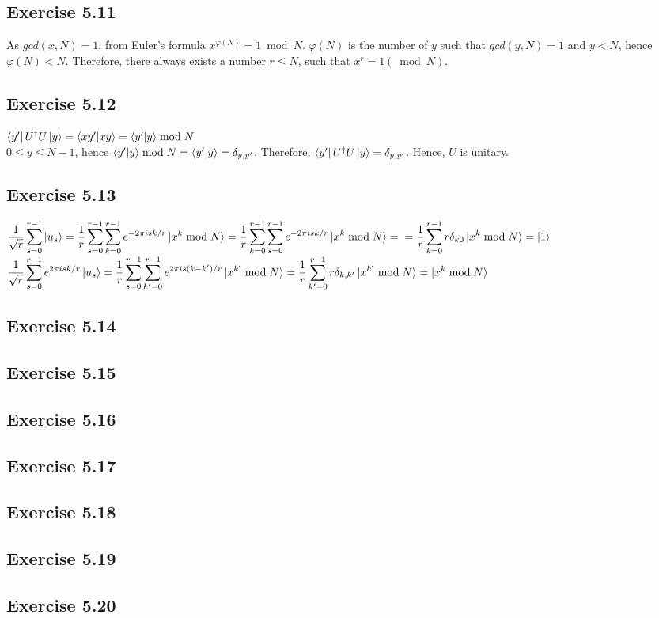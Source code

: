 \documentclass[a4paper,12pt]{article}
\begin{document}
\subsection*{Exercise 5.11}
As $gcd(x, N)=1$, from Euler's formula $x^{\varphi(N)}=1\bmod N$. $\varphi(N)$ is the number
of $y$ such that $gcd(y,N)=1$ and $y<N$, hence $\varphi(N)<N$. Therefore, there always exists a
number $r\leq N$, such that $x^r=1(\bmod N)$.
\subsection*{Exercise 5.12}
$\bra{y^\prime}U^\dagger U\ket{y}=\braket{xy^\prime|xy}=\braket{y^\prime|y}\bmod N$\\
$0\leq y\leq N-1$, hence $\braket{y^\prime|y}\bmod N=\braket{y^\prime|y}=\delta_{y,y^\prime}$. Therefore,
$\bra{y^\prime}U^\dagger U\ket{y}=\delta_{y,y^\prime}$.
Hence, $U$ is unitary.
\subsection*{Exercise 5.13}
$\displaystyle\frac{1}{\sqrt{r}}\displaystyle\sum_{s=0}^{r-1}\ket{u_s}=
\frac{1}{r}\displaystyle\sum_{s=0}^{r-1}\sum_{k=0}^{r-1}e^{-2\pi isk/r}\ket{x^k\bmod N}=
\frac{1}{r}\displaystyle\sum_{k=0}^{r-1}\sum_{s=0}^{r-1}e^{-2\pi isk/r}\ket{x^k\bmod N}=\\
=\frac{1}{r}\displaystyle\sum_{k=0}^{r-1}r\delta_{k0}\ket{x^k\bmod N}=\ket{1}$\\
$\displaystyle\frac{1}{\sqrt{r}}\displaystyle\sum_{s=0}^{r-1}e^{2\pi isk/r}\ket{u_s}=
\frac{1}{r}\displaystyle\sum_{s=0}^{r-1}\sum_{k^\prime=0}^{r-1}
e^{2\pi is(k-k^\prime)/r}\ket{x^{k^\prime}\bmod N}=
\frac{1}{r}\displaystyle\sum_{k^\prime=0}^{r-1}r\delta_{k,k^\prime}\ket{x^{k^\prime}\bmod N}=
\ket{x^k\bmod N}$
\subsection*{Exercise 5.14}

\subsection*{Exercise 5.15}
\subsection*{Exercise 5.16}
\subsection*{Exercise 5.17}
\subsection*{Exercise 5.18}
\subsection*{Exercise 5.19}
\subsection*{Exercise 5.20}
\end{document}
